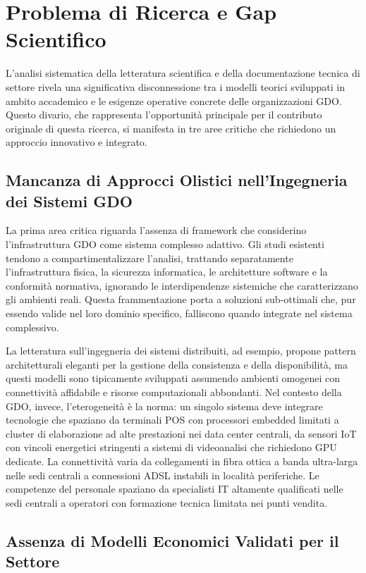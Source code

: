 \section{Problema di Ricerca e Gap Scientifico}

L'analisi sistematica della letteratura scientifica e della documentazione tecnica di settore rivela una significativa disconnessione tra i modelli teorici sviluppati in ambito accademico e le esigenze operative concrete delle organizzazioni GDO. Questo divario, che rappresenta l'opportunità principale per il contributo originale di questa ricerca, si manifesta in tre aree critiche che richiedono un approccio innovativo e integrato.

\subsection{Mancanza di Approcci Olistici nell'Ingegneria dei Sistemi GDO}

La prima area critica riguarda l'assenza di framework che considerino l'infrastruttura GDO come sistema complesso adattivo. Gli studi esistenti tendono a compartimentalizzare l'analisi, trattando separatamente l'infrastruttura fisica, la sicurezza informatica, le architetture software e la conformità normativa, ignorando le interdipendenze sistemiche che caratterizzano gli ambienti reali. Questa frammentazione porta a soluzioni sub-ottimali che, pur essendo valide nel loro dominio specifico, falliscono quando integrate nel sistema complessivo.

La letteratura sull'ingegneria dei sistemi distribuiti, ad esempio, propone pattern architetturali eleganti per la gestione della consistenza e della disponibilità, ma questi modelli sono tipicamente sviluppati assumendo ambienti omogenei con connettività affidabile e risorse computazionali abbondanti. Nel contesto della GDO, invece, l'eterogeneità è la norma: un singolo sistema deve integrare tecnologie che spaziano da terminali POS con processori embedded limitati a cluster di elaborazione ad alte prestazioni nei data center centrali, da sensori IoT con vincoli energetici stringenti a sistemi di videoanalisi che richiedono GPU dedicate. La connettività varia da collegamenti in fibra ottica a banda ultra-larga nelle sedi centrali a connessioni ADSL instabili in località periferiche. Le competenze del personale spaziano da specialisti IT altamente qualificati nelle sedi centrali a operatori con formazione tecnica limitata nei punti vendita.

\subsection{Assenza di Modelli Economici Validati per il Settore}


